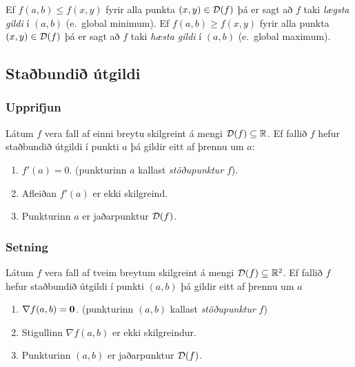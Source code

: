 \medskip
Ef $f(a,b)\leq f(x,y)$ fyrir alla punkta $(x,y)\in {\cal D}(f)$ þá er
sagt að $f$ taki {\em \color{red}lægsta gildi} í $(a,b)$ (e.~global minimum).
Ef $f(a,b)\geq f(x,y)$ fyrir alla punkta $(x,y)\in {\cal D}(f)$ þá er
sagt að $f$ taki {\em \color{red}hæsta gildi} í $(a,b)$ (e.~global maximum).






\subsection{Staðbundið útgildi} 

\subsubsection{Upprifjun}
   Látum $f$ vera fall af einni breytu
skilgreint á mengi ${\cal D}(f)\subseteq {\mathbb R}$.  Ef fallið $f$ hefur
staðbundið útgildi í punkti $a$ þá gildir eitt af þrennu um $a$:

\begin{enumerate}
 \item $f'(a)=0$. \qquad (punkturinn $a$ kallast {\em \color{red}stöðupunktur} $f$).
 \item Afleiðan $f'(a)$ er ekki skilgreind.
 \item   Punkturinn $a$ er jaðarpunktur ${\cal D}(f)$.
\end{enumerate}





\subsubsection{Setning  }
 Látum $f$ vera fall af tveim breytum
skilgreint á mengi ${\cal D}(f)\subseteq {\mathbb R}^2$.  Ef fallið $f$ hefur
staðbundið útgildi í punkti $(a,b)$ þá gildir eitt af þrennu um $a$
\begin {enumerate}
 \item  $\nabla f(a,b)=\mbox{${\bf 0}$}$. \qquad (punkturinn $(a,b)$ kallast {\em \color{red}stöðupunktur} $f$) 
\item Stigullinn $\nabla f(a,b)$ er ekki skilgreindur.
\item Punkturinn $(a,b)$ er jaðarpunktur ${\cal D}(f)$.
\end {enumerate}





